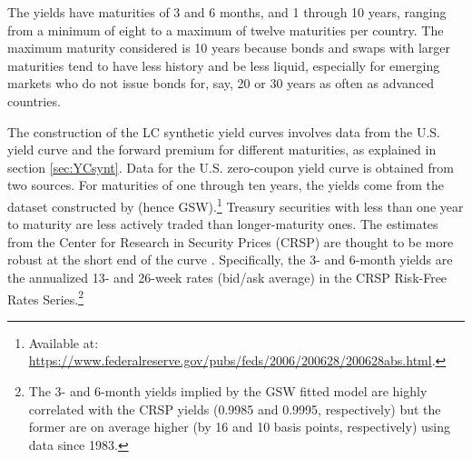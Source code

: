 {The yields have maturities of 3 and 6 months, and 1 through 10 years, ranging from a minimum of eight to a maximum of twelve maturities per country. 
The maximum maturity considered is 10 years because bonds and swaps with larger maturities tend to have less history and be less liquid, especially for emerging markets who do not issue bonds for, say, 20 or 30 years as often as advanced countries.
%	

The construction of the LC synthetic yield curves involves data from the U.S. yield curve and the forward premium for different maturities, as explained in section \ref{sec:YCsynt}. 
Data for the U.S. zero-coupon yield curve is obtained from two sources. 
For maturities of one through ten years, the yields come from the dataset constructed by \cite*{GSW:2007} (hence GSW).\footnote{Available at: \url{https://www.federalreserve.gov/pubs/feds/2006/200628/200628abs.html}.} 
Treasury securities with less than one year to maturity are less actively traded than longer-maturity ones. 
The estimates from the Center for Research in Security Prices (CRSP) are thought to be more robust at the short end of the curve \citep{Duffee:2010}.
Specifically, the 3- and 6-month yields are the annualized 13- and 26-week rates (bid/ask average) in the CRSP Risk-Free Rates Series.\footnote{ The 3- and 6-month yields implied by the GSW fitted model are highly correlated with the CRSP yields (0.9985 and 0.9995, respectively) but the former are on average higher (by 16 and 10 basis points, respectively) using data since 1983.} 

}
